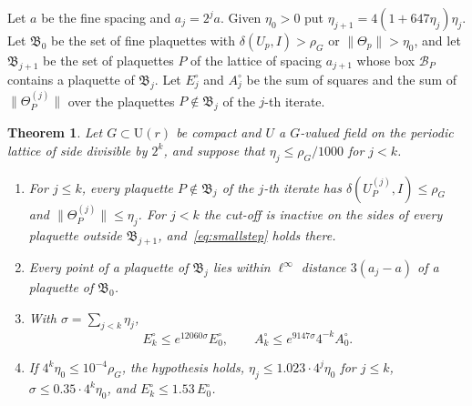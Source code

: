 \documentclass[11pt]{amsart}
\newtheorem{theorem}{Theorem}[section]
\theoremstyle{definition}
\theoremstyle{remark}
\numberwithin{equation}{section}
\newcommand{\U}{\mathrm{U}}
\begin{document}
Let $a$ be the fine spacing and $a_j=2^ja$. Given $\eta_0>0$ put $\eta_{j+1}=
4(1+647\eta_j)\eta_j$. Let $\mathfrak B_0$ be the set of fine plaquettes with
$\delta(U_p,I)>\rho_G$ or $\lVert\Theta_p\rVert>\eta_0$, and let $\mathfrak
B_{j+1}$ be the set of plaquettes $P$ of the lattice of spacing $a_{j+1}$
whose box $\mathcal B_P$ contains a plaquette of $\mathfrak B_j$. Let
$E^\circ_j$ and $A^\circ_j$ be the sum of squares and the sum of $\lVert
\Theta^{(j)}_P\rVert$ over the plaquettes $P\notin\mathfrak B_j$ of the
$j$-th iterate.

\begin{theorem}\label{thm:defectscales}
Let $G\subset\U(r)$ be compact and $U$ a $G$-valued field on the periodic
lattice of side divisible by $2^k$, and suppose that $\eta_j\le\rho_G/1000$
for $j<k$.
\begin{enumerate}[label=\textup{(\roman*)},leftmargin=*]
\item For $j\le k$, every plaquette $P\notin\mathfrak B_j$ of the $j$-th
iterate has $\delta(U^{(j)}_P,I)\le\rho_G$ and $\lVert\Theta^{(j)}_P\rVert
\le\eta_j$. For $j<k$ the cut-off is inactive on the sides of every
plaquette outside $\mathfrak B_{j+1}$, and~\eqref{eq:smallstep} holds
there.
\item Every point of a plaquette of $\mathfrak B_j$ lies within $\ell^\infty$
distance $3(a_j-a)$ of a plaquette of $\mathfrak B_0$.
\item With $\sigma=\sum_{j<k}\eta_j$,
\[
E^\circ_k\le e^{12060\sigma}E^\circ_0,\qquad A^\circ_k\le e^{9147
\sigma}4^{-k}A^\circ_0 .
\]
\item If $4^k\eta_0\le10^{-4}\rho_G$, the hypothesis holds, $\eta_j\le1.023
\cdot4^j\eta_0$ for $j\le k$, $\sigma\le0.35\cdot4^k\eta_0$, and
$E^\circ_k\le1.53\,E^\circ_0$.
\end{enumerate}
\end{theorem}
\end{document}
